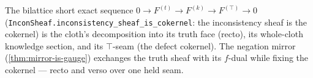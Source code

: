 \begin{theorem}\label{thm:recto-verso-ses}\leanok{}
The bilattice short exact sequence
$0 \to F^{(t)} \to F^{(k)} \to F^{(\top)} \to 0$ (\texttt{InconSheaf.inconsistency\_sheaf\_is\_cokernel}:
the inconsistency sheaf is the cokernel) is the cloth's decomposition into its truth face
(recto), its whole-cloth knowledge section, and its $\top$-seam (the defect cokernel). The
negation mirror (\cref{thm:mirror-is-gauge}) exchanges the truth sheaf with its $f$-dual while
fixing the cokernel --- recto and verso over one held seam.
\end{theorem}
